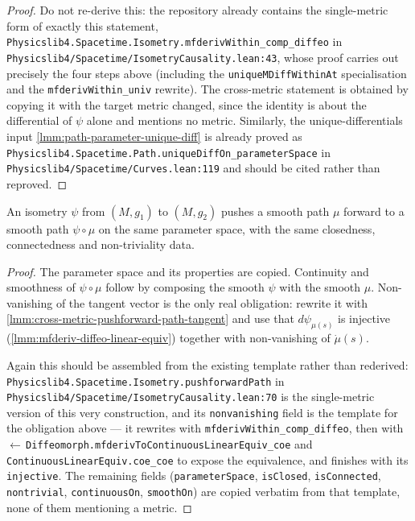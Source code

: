\begin{proof}
    Do not re-derive this: the repository already contains the single-metric form of exactly this statement, \texttt{Physicslib4.Spacetime.Isometry.mfderivWithin\_comp\_diffeo} in \texttt{Physicslib4/Spacetime/IsometryCausality.lean:43}, whose proof carries out precisely the four steps above (including the \texttt{uniqueMDiffWithinAt} specialisation and the \texttt{mfderivWithin\_univ} rewrite). The cross-metric statement is obtained by copying it with the target metric changed, since the identity is about the differential of $\psi$ alone and mentions no metric. Similarly, the unique-differentials input \ref{lmm:path-parameter-unique-diff} is already proved as \texttt{Physicslib4.Spacetime.Path.uniqueDiffOn\_parameterSpace} in \texttt{Physicslib4/Spacetime/Curves.lean:119} and should be cited rather than reproved.
\end{proof}

\begin{lemma}
    \label{lmm:cross-metric-pushforward-path}
    An isometry $\psi$ from $(M,g_1)$ to $(M,g_2)$ pushes a smooth path $\mu$ forward to a smooth path $\psi \circ \mu$ on the same parameter space, with the same closedness, connectedness and non-triviality data.
\end{lemma}
\begin{proof}
    The parameter space and its properties are copied. Continuity and smoothness of $\psi \circ \mu$ follow by composing the smooth $\psi$ with the smooth $\mu$. Non-vanishing of the tangent vector is the only real obligation: rewrite it with \ref{lmm:cross-metric-pushforward-path-tangent} and use that $d\psi_{\mu(s)}$ is injective (\ref{lmm:mfderiv-diffeo-linear-equiv}) together with non-vanishing of $\dot\mu(s)$.

    Again this should be assembled from the existing template rather than rederived: \texttt{Physicslib4.Spacetime.Isometry.pushforwardPath} in \texttt{Physicslib4/Spacetime/IsometryCausality.lean:70} is the single-metric version of this very construction, and its \texttt{nonvanishing} field is the template for the obligation above --- it rewrites with \texttt{mfderivWithin\_comp\_diffeo}, then with $\leftarrow$\,\texttt{Diffeomorph.mfderivToContinuousLinearEquiv\_coe} and \texttt{ContinuousLinearEquiv.coe\_coe} to expose the equivalence, and finishes with its \texttt{injective}. The remaining fields (\texttt{parameterSpace}, \texttt{isClosed}, \texttt{isConnected}, \texttt{nontrivial}, \texttt{continuousOn}, \texttt{smoothOn}) are copied verbatim from that template, none of them mentioning a metric.
\end{proof}

